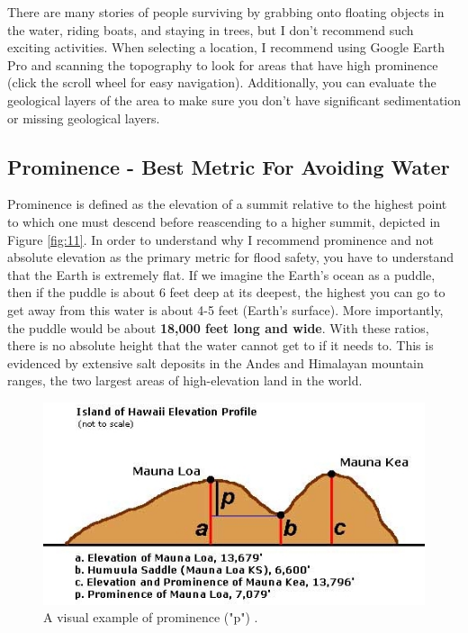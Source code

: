 \documentclass[10pt,twocolumn,letterpaper]{article}
\begin{document}
There are many stories of people surviving by grabbing onto floating objects in the water, riding boats, and staying in trees, but I don't recommend such exciting activities. When selecting a location, I recommend using Google Earth Pro and scanning the topography to look for areas that have high prominence (click the scroll wheel for easy navigation). Additionally, you can evaluate the geological layers of the area to make sure you don't have significant sedimentation or missing geological layers.

\subsection{Prominence - Best Metric For Avoiding Water}

Prominence is defined as the elevation of a summit relative to the highest point to which one must descend before reascending to a higher summit, depicted in Figure \ref{fig:11}. In order to understand why I recommend prominence and not absolute elevation as the primary metric for flood safety, you have to understand that the Earth is extremely flat. If we imagine the Earth's ocean as a puddle, then if the puddle is about 6 feet deep at its deepest, the highest you can go to get away from this water is about 4-5 feet (Earth's surface). More importantly, the puddle would be about \textbf{18,000 feet long and wide}. With these ratios, there is no absolute height that the water cannot get to if it needs to. This is evidenced by extensive salt deposits in the Andes and Himalayan mountain ranges, the two largest areas of high-elevation land in the world.

\begin{figure}[t]
\begin{center}
   \includegraphics[width=1\linewidth]{prominence.jpeg}
\end{center}
   \caption{A visual example of prominence ("p") \cite{53}.}
\label{fig:11}
\label{fig:onecol}
\end{figure}
\end{document}
